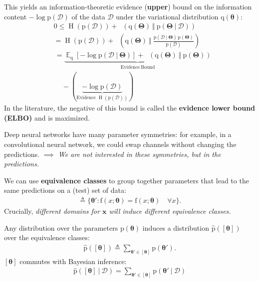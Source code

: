 \documentclass[25pt,a0paper,landscape]{tikzposter}
\DeclareMathOperator{\opExpectation}{\mathbb{E}}
\newcommand{\E}[2]{\opExpectation_{#1} \left [ #2 \right ]}
\newcommand{\MidSymbol}[1][]{\:#1\:}
\newcommand{\given}{\MidSymbol[\vert]}
\DeclareMathOperator{\opEntropy}{H}
\newcommand{\xHof}[1]{\opEntropy(#1)}
\DeclareMathOperator{\opKale}{D_\mathrm{KL}}
\newcommand{\Kale}[2]{\opKale(#1 \MidSymbol[\Vert] #2)}
\newcommand{\opp}{\mathrm{p}}
\newcommand{\pof}[1]{\opp(#1)}
\newcommand{\hpof}[1]{\hat{\opp}(#1)}
\newcommand{\opq}{\mathrm{q}}
\newcommand{\qof}[1]{\opq(#1)}
\newcommand{\w}{\boldsymbol{\theta}}
\newcommand{\W}{\boldsymbol{\Theta}}
\newcommand{\opf}{\mathrm{f}}
\newcommand{\fof}[1]{\opf(#1)}
\newcommand{\Dany}{\mathcal{D}}
\newcommand{\x}{\boldsymbol{x}}
\begin{document}
\begin{columns}
{\begin{multicols}{2}
\begin{backgroundbox}[title=(Regular) Variational Inference \& ELBO]
      This yields an information-theoretic evidence (\textbf{upper}) bound on the information content $-\log \pof{\Dany}$ of the data $\Dany$ under the variational distribution $\qof{\w}$:
      \begin{align*}
      & 0 \le \xHof{\pof{\Dany}} + \Kale{\qof{\W}}{\pof{\W \given \Dany}} \\
      &= \xHof{\pof{\Dany}} + \Kale{\qof{\W}}{\frac{\pof{\Dany \given \W}\,\pof{\W}}{\pof{\Dany}}}\\
      &\, = \underbrace{\E{\opq}{-\log \pof{\Dany \given \W}} + \Kale{\qof{\W}}{\pof{\W}}}_{\text{Evidence}\ \text{Bound}} \\
      &\, \quad - (\underbrace{-\log \pof{\Dany}}_{\text{Evidence }\xHof{\pof{\Dany}}})
      \end{align*}
      In the literature, the negative of this bound is called the \textbf{evidence lower bound (ELBO)} and is maximized.
    \end{backgroundbox}
    \begin{theorybox}[title=Parameter Symmetries]
      Deep neural networks have many parameter symmetries: for example, in a convolutional neural network, we could swap channels without changing the predictions.
      \emph{$\implies$ We are not interested in these symmetries, but in the predictions.}
    \end{theorybox}
    \begin{theorybox}[title=Equivalence Classes]
      We can use \textbf{equivalence classes} to group together parameters that lead to the same predictions on a (test) set of data:
      \begin{align*}
        [\w] \triangleq \{\w' : \fof{x ; \w} = \fof{x ; \w} \quad \forall x \}.
      \end{align*}
      Crucially, \emph{different domains for $\x$ will induce different equivalence classes.}
    \end{theorybox}
    \begin{theorybox}[title=Consistency of Equivalence Classes with Bayesian Inference]
      Any distribution over the parameters $\pof{\w}$ induces a distribution $\hpof{[\w]}$ over the equivalence classes:
      \begin{align*}
        \hpof{[\w]} \triangleq \sum_{\w' \in [\w]} \pof{\w'}.
      \end{align*}
      $[\w]$ commutes with Bayesian inference:
      \begin{align*}
        \hpof{[\w] \given \Dany} = \sum_{\w' \in [\w]} \pof{\w' \given \Dany}

\end{align*}
\end{theorybox}
\end{multicols}}
\end{columns}
\end{document}
